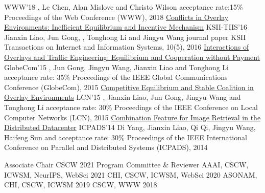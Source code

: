 \documentclass[letterpaper]{awesome-cv}
\begin{document}
\begin{cventries}
    {WWW'18}
    {, Le Chen, Alan Mislove and Christo Wilson}
    {acceptance rate:15\%}
    { Proceedings of the Web Conference (WWW), 2018}
  \cvpub
    {\href{https://shanjiang.me/publications/tiis16_paper.pdf}{Conflicts in Overlay Environments: Inefficient Equilibrium and Incentive Mechanism}}
    {KSII-TIIS'16}
    {Jianxin Liao, Jun Gong, , Tonghong Li and Jingyu Wang}
    {journal paper}
    {KSII Transactions on Internet and Information Systems, 10(5), 2016}
  \cvpub
    {\href{https://shanjiang.me/publications/globecom15_paper.pdf}{Interactions of Overlays and Traffic Engineering: Equilibrium and Cooperation without Payment}}
    {GlobeCom'15}
    {, Jun Gong, Jingyu Wang, Jianxin Liao and Tonghong Li}
    {acceptance rate: 35\%}
    { Proceedings of the IEEE Global Communications Conference (GlobeCom), 2015}
  \cvpub
    {\href{https://shanjiang.me/publications/lcn15_paper.pdf}{Competitive Equilibrium and Stable Coalition in Overlay Environments}}
    {LCN'15}
    {, Jianxin Liao, Jun Gong, Jingyu Wang and Tonghong Li}
    {acceptance rate: 30\%}
    { Proceedings of the IEEE Conference on Local Computer Networks (LCN), 2015}
  \cvpub
    {\href{https://shanjiang.me/publications/icpads14_paper.pdf}{Combination Feature for Image Retrieval in the Distributed Datacenter}}
    {ICPADS'14}
    {Di Yang, Jianxin Liao, Qi Qi, Jingyu Wang, Haifeng Sun and }
    {acceptance rate: 30\%}
    { Proceedings of the IEEE International Conference on Parallel and Distributed Systems (ICPADS), 2014}
\end{cventries}

\addvspace{3ex}
\addvspace{1ex}

\begin{cventries}
  \cvaward
    {Associate Chair}
    {CSCW}
    {2021}
  \cvaward
    {Program Committee \& Reviewer}
    {AAAI, CSCW, ICWSM, NeurIPS, WebSci}
    {2021}
  \cvaward
    {}
    {CHI, CSCW, ICWSM, WebSci}
    {2020}
  \cvaward
    {}
    {ASONAM, CHI, CSCW, ICWSM}
    {2019}
  \cvaward
    {}
    {CSCW, WWW}
    {2018}
\end{cventries}
\end{document}
